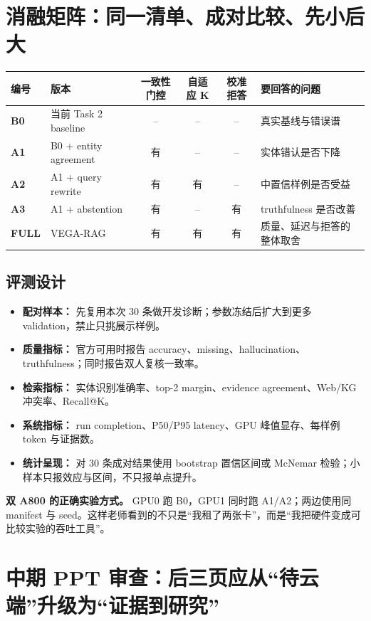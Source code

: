 \documentclass[11pt,a4paper]{ctexart}
\begin{document}
\section{消融矩阵：同一清单、成对比较、先小后大}

\begin{tabularx}{\textwidth}{>{\bfseries}p{15mm} p{38mm} c c c X}
\toprule
编号 & 版本 & 一致性门控 & 自适应 K & 校准拒答 & 要回答的问题 \\
\midrule
B0 & 当前 Task 2 baseline & -- & -- & -- & 真实基线与错误谱 \\
A1 & B0 + entity agreement & 有 & -- & -- & 实体错认是否下降 \\
A2 & A1 + query rewrite & 有 & 有 & -- & 中置信样例是否受益 \\
A3 & A1 + abstention & 有 & -- & 有 & truthfulness 是否改善 \\
FULL & VEGA-RAG & 有 & 有 & 有 & 质量、延迟与拒答的整体取舍 \\
\bottomrule
\end{tabularx}

\subsection{评测设计}
\begin{itemize}
  \item \textbf{配对样本：} 先复用本次 30 条做开发诊断；参数冻结后扩大到更多 validation，禁止只挑展示样例。
  \item \textbf{质量指标：} 官方可用时报告 accuracy、missing、hallucination、truthfulness；同时报告双人复核一致率。
  \item \textbf{检索指标：} 实体识别准确率、top-2 margin、evidence agreement、Web/KG 冲突率、Recall@K。
  \item \textbf{系统指标：} run completion、P50/P95 latency、GPU 峰值显存、每样例 token 与证据数。
  \item \textbf{统计呈现：} 对 30 条成对结果使用 bootstrap 置信区间或 McNemar 检验；小样本只报效应与区间，不只报单点提升。
\end{itemize}

\begin{callout}
\textbf{双 A800 的正确实验方式。} GPU0 跑 B0，GPU1 同时跑 A1/A2；两边使用同 manifest 与 seed。这样老师看到的不只是“我租了两张卡”，而是“我把硬件变成可比较实验的吞吐工具”。
\end{callout}
\clearpage

\section{中期 PPT 审查：后三页应从“待云端”升级为“证据到研究”}
\end{document}
